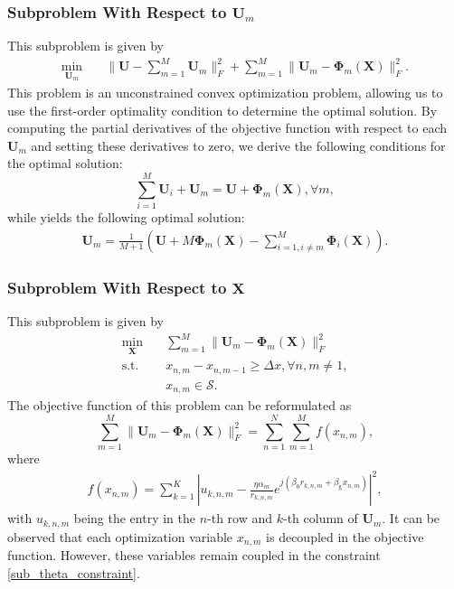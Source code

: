 \subsubsection{Subproblem With Respect to $\mathbf{U}_m$}
This subproblem is given by 
\begin{align}
    \min_{\mathbf{U}_m} \quad &\| \mathbf{U} - \sum_{m=1}^M \mathbf{U}_m \|_F^2 + \sum_{m=1}^M \| \mathbf{U}_m - \mathbf{\Phi}_m(\mathbf{X}) \|_F^2.
\end{align}
This problem is an unconstrained convex optimization problem, allowing us to use the first-order optimality condition to determine the optimal solution. By computing the partial derivatives of the objective function with respect to each $\mathbf{U}_m$ and setting these derivatives to zero, we derive the following conditions for the optimal solution:
\begin{equation}
    \sum_{i=1}^M \mathbf{U}_i + \mathbf{U}_m = \mathbf{U} + \mathbf{\Phi}_m(\mathbf{X}), \forall m,
\end{equation}
while yields the following optimal solution:
\begin{align} \label{subproblem_U_optimal}
    \mathbf{U}_m = \frac{1}{M+1} \left( \mathbf{U} + M \mathbf{\Phi}_m(\mathbf{X}) - \sum_{i=1, i \neq m}^M \mathbf{\Phi}_i(\mathbf{X})    \right).
\end{align}
\subsubsection{Subproblem With Respect to $\mathbf{X}$}
This subproblem is given by 
\begin{subequations} \label{subproblem_theta}
    \begin{align}
        \min_{\mathbf{X}} \quad & \sum_{m=1}^M \| \mathbf{U}_m - \mathbf{\Phi}_m(\mathbf{X})\|_F^2 \\
        \label{sub_theta_constraint}
        \mathrm{s.t.} \quad &  x_{n,m} - x_{n,m-1} \ge \Delta x, \forall n, m\neq 1, \\
        & x_{n,m} \in \mathcal{S}.
    \end{align}
\end{subequations}
The objective function of this problem can be reformulated as 
\begin{equation}
    \sum_{m=1}^M \| \mathbf{U}_m - \mathbf{\Phi}_m(\mathbf{X}) \|_F^2 = \sum_{n=1}^N \sum_{m=1}^M f(x_{n,m}),
\end{equation}
where 
\begin{align}
    f(x_{n,m}) = \sum_{k=1}^K \left| u_{k,n,m}  - \frac{\eta \alpha_m }{r_{k,n,m}} e^{j\left( \beta_0 r_{k,n,m} + \beta_{\mathrm{g}} x_{n,m} \right)} \right|^2,
\end{align}
with $u_{k,n,m}$ being the entry in the $n$-th row and $k$-th column of $\mathbf{U}_m$. It can be observed that each optimization variable $x_{n,m}$ is decoupled in the objective function. However, these variables remain coupled in the constraint \eqref{sub_theta_constraint}. 

